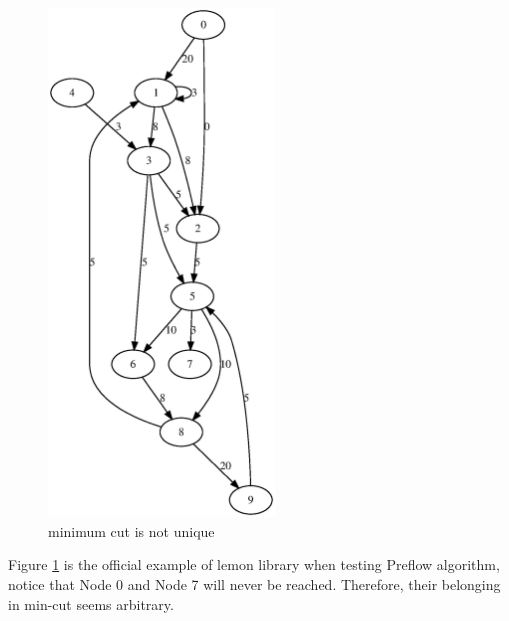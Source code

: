 \documentclass{article}
\begin{document}
\begin{figure}[!ht]
\centering
\includegraphics[width=6cm]{fig/test.eps}
\caption{minimum cut is not unique}\label{fig:ex}
\end{figure}

Figure \ref{fig:ex} is the official example of lemon library when testing Preflow algorithm, notice that Node 0 and Node 7 will never be reached. Therefore, their belonging in min-cut seems arbitrary. 
\end{document}
